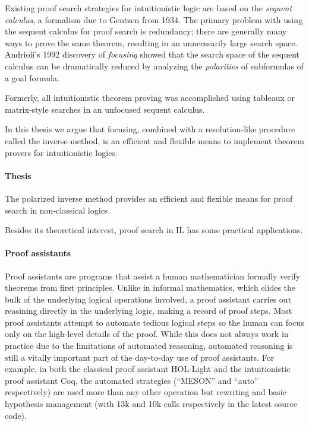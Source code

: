 Existing proof search strategies for intuitionistic logic are
based on the \emph{sequent calculus}, a formalism due to Gentzen from 1934.
The primary problem with using the sequent calculus for proof search
is redundancy; there are generally many ways to prove the same theorem,
resulting in an unnecssarily large search space.
Andrioli's 1992 discovery of
\emph{focusing} showed that the search space of the sequent calculus can
be dramatically reduced by analyzing the \emph{polarities} of subformulas of
a goal formula.

Formerly, all intuitionistic theorem proving was
accomplished using tableaux or matrix-style searches in an unfocused
sequent calculus.

In this thesis we argue that focusing,
combined with a resolution-like procedure called the inverse-method,
is an efficient and flexible means to implement theorem provers for
intuitionistic logics.

\paragraph{Thesis}
The polarized inverse method provides an efficient and flexible means for proof
search in non-classical logics.

\bigskip

\noindent
Besides its theoretical interest, proof search in IL has some practical
applications.

\paragraph{Proof assistants}
Proof assistants are programs that assist a human mathematician
formally verify theorems from first principles.  Unlike in informal
mathematics, which elides the bulk of the underlying logical operations
involved, a proof assistant carries out reasining directly in the
underlying logic, making a record of proof steps.  Most proof assistants
attempt to automate tedious logical steps so the human can focus only
on the high-level details of the proof.  While this does not always
work in practice due to the limitations of automated reasoning, automated
reasoning is still a vitally important part of the day-to-day use of
proof assistants.  For example, in both the classical proof assistant
HOL-Light and the intuitionistic proof assistant Coq, the automated
strategies (``MESON'' and ``auto'' respectively) are used more than
any other operation but rewriting and basic hypothesis management
(with 13k and 10k calls respectively in the latest source code).

